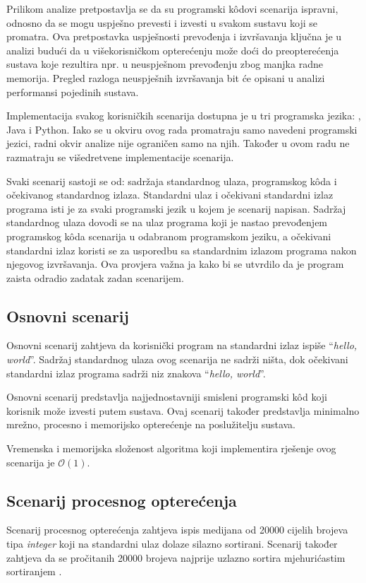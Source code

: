 \documentclass[times, utf8, diplomski]{fer}
\begin{document}
Prilikom analize pretpostavlja se da su programski kôdovi scenarija ispravni, odnosno da se mogu uspješno prevesti i izvesti u svakom sustavu koji se promatra. Ova pretpostavka uspješnosti prevođenja i izvršavanja ključna je u analizi budući da u višekorisničkom opterećenju može doći do preopterećenja sustava koje rezultira npr. u neuspješnom prevođenju zbog manjka radne memorija. Pregled razloga neuspješnih izvršavanja bit će opisani u analizi performansi pojedinih sustava.

Implementacija svakog korisničkih scenarija dostupna je u tri programska jezika: , Java i Python. Iako se u okviru ovog rada promatraju samo navedeni programski jezici, radni okvir analize nije ograničen samo na njih. Također u ovom radu ne razmatraju se višedretvene implementacije scenarija.

Svaki scenarij sastoji se od: sadržaja standardnog ulaza, programskog kôda i očekivanog standardnog izlaza. Standardni ulaz i očekivani standardni izlaz programa isti je za svaki programski jezik u kojem je scenarij napisan. Sadržaj standardnog ulaza dovodi se na ulaz programa koji je nastao prevođenjem programskog kôda scenarija u odabranom programskom jeziku, a očekivani standardni izlaz koristi se za usporedbu sa standardnim izlazom programa nakon njegovog izvršavanja. Ova provjera važna ja kako bi se utvrdilo da je program zaista odradio zadatak zadan scenarijem.

\subsection{Osnovni scenarij}
Osnovni scenarij zahtjeva da korisnički program na standardni izlaz ispiše ``\textit{hello, world}''. Sadržaj standardnog ulaza ovog scenarija ne sadrži ništa, dok očekivani standardni izlaz programa sadrži niz znakova ``\textit{hello, world}''.

Osnovni scenarij predstavlja najjednostavniji smisleni programski kôd koji korisnik može izvesti putem sustava. Ovaj scenarij također predstavlja minimalno mrežno, procesno i memorijsko opterećenje na poslužitelju sustava.

Vremenska i memorijska složenost algoritma koji implementira rješenje ovog scenarija je $\mathcal{O}(1)$.

\subsection{Scenarij procesnog opterećenja}
Scenarij procesnog opterećenja zahtjeva ispis medijana od 20000 cijelih brojeva tipa \textit{integer} koji na standardni ulaz dolaze silazno sortirani. Scenarij također zahtjeva da se pročitanih 20000 brojeva najprije uzlazno sortira mjehurićastim sortiranjem .
\end{document}
